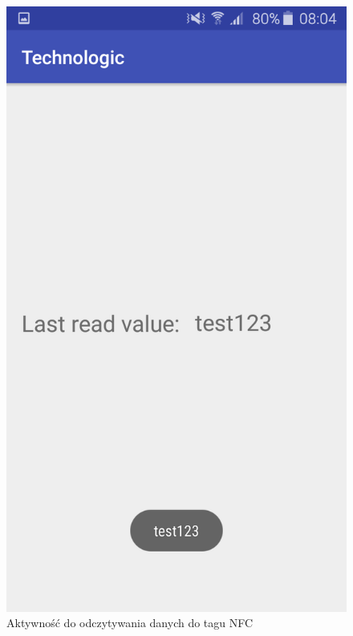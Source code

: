 \documentclass{article}
\numberwithin{equation}{section}
\begin{document}
\begin{figure}[H]
    \centering
    \includegraphics[scale=0.22]{read.png}
    \caption{Aktywność do odczytywania danych do tagu NFC}
\end{figure}
\end{document}
